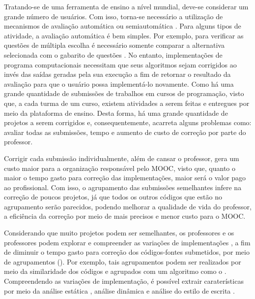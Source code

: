	Tratando-se de uma ferramenta de ensino a nível mundial, deve-se considerar um
	grande número de usuários. Com isso, torna-se necessário a utilização de mecanismos
	de avaliação automática ou semiautomática \cite{schmidt2013producing}. Para alguns
	tipos de atividade, a avaliação automática é bem simples. Por exemplo, para verificar
	as questões	de múltipla escolha é necessário somente comparar a alternativa selecionada
	com o gabarito de questões \cite{alario2013analysing}. No entanto, implementações de
	programa computacionais necessitam que seus algoritmos sejam corrigidos ao invés das
	saídas geradas pela sua execução a fim de retornar o resultado da avaliação para que
	o usuário possa implementá-lo novamente. Como há uma grande quantidade de submissões
	de trabalhos em	cursos de programação, visto que, a cada turma de um curso, existem
	atividades a serem feitas e entregues por meio da plataforma de ensino. Desta forma,
	há uma grande quantidade de projetos a serem corrigidos e, consequentemente, acarreta
	alguns problemas como: avaliar todas as submissões, tempo e aumento de custo de correção
	por parte do professor.
	
	
	Corrigir cada submissão individualmente, além de cansar o professor, gera um custo maior
	para a organização responsável pelo MOOC, visto que, quanto o maior o tempo gasto
	para correção das implementações, maior será o valor pago ao profissional. Com
	isso, o agrupamento das submissões semelhantes infere na correção de poucos
	projetos, já que todos os outros códigos que estão no agrupamento serão
	parecidos, podendo melhorar a qualidade de vida do professor, a eficiência da correção
	por meio de  mais precisos e menor custo para o MOOC.
	
	Considerando que muito projetos podem ser semelhantes, os professores e os professores
	podem explorar e compreender as variações de implementações \cite{Yin:2015}, a fim de
	diminuir o tempo gasto para correção dos códigos-fontes submetidos, por meio de
	agrupamentos (). Por exemplo, tais agrupamentos podem ser
	realizados por meio da similaridade dos códigos e agrupados com um algoritmo como
	o . Compreendendo as variações de implementação, é possível extrair
	caraterísticas por meio da análise estática \cite{Yin:2015,Glassman:2014,Taherkhani:2012},
	análise dinâmica \cite{Glassman:2015} e análise do estilo de escrita \cite{Wei2015}.
	
